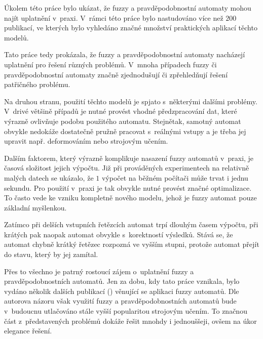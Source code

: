 \documentclass[
  master,
  field=inf,
  biblatex=true,
  language=czech,
  theorems=false,
  sourcecodes=false,
  glossaries=false,
  index=false,
]{kidiplom}
\numberwithin{definition}{section}
\numberwithin{theorem}{section}
\numberwithin{note}{section}
\numberwithin{example}{section}
\begin{document}
\begin{kiconclusions}
Úkolem této práce bylo ukázat, že fuzzy a pravděpodobnostní automaty mohou najít uplatnění v~praxi. V~rámci této práce bylo nastudováno více než $200$ publikací, ve kterých bylo vyhledáno značné množství praktických aplikací těchto modelů.

Tato práce tedy prokázala, že fuzzy a pravděpodobnostní automaty nacházejí uplatnění pro řešení různých problémů. V~mnoha případech fuzzy či pravděpodobnostní automaty značně zjednodušují či zpřehledňují řešení patřičného problému.

Na druhou stranu, použití těchto modelů je spjato s~některými dalšími problémy. V~drivé většině případů je nutné provést vhodné předzpracování dat, které výrazně ovlivňuje podobu použitého automatu. Stejnětak, samotný automat obvykle nedokáže dostatečně pružně pracovat s~reálnými vstupy a je třeba jej upravit např. deformováním nebo strojovým učením.

Dalším faktorem, který výrazně komplikuje nasazení fuzzy automatů v~praxi, je časová složitost jejich výpočtu. Již při prováděných experimentech na relativně malých datech se ukázalo, že $1$ výpočet na běžném počítači může trvat i jednu sekundu. Pro použití v~praxi je tak obvykle nutné provést značné optimalizace. To často vede ke vzniku kompletně nového modelu, jehož je fuzzy automat pouze základní myšlenkou.

Zatímco při delších vstupních řetězcích automat trpí dlouhým časem výpočtu, při krátých pak naopak automat obvykle  s~korektností výsledků. Stává se, že automat chybně krátký řetězec rozpozná ve vyšším stupni, protože automat  přejít do stavu, který by jej zamítal.

Přes to všechno je patrný rostoucí zájem o~uplatnění fuzzy a pravděpodobnostních automatů. Jen za dobu, kdy tato práce vznikala, bylo vydáno několik dalších publikací (\cite{MukRay-StaSplMerProbFiStaAuSigRepAna, ManPra-PriPatDetUsFiStMaFuzTra, Jia+-ExHeaSimMetBasIntHumTheMod, GupRah-CliMonUsFuzSys, CamMerNun-UsFuzAutDiagPrHeaPro}) věnující se aplikaci fuzzy automatů. Dle autorova názoru však využití fuzzy a pravděpodobnostních automatů bude v~budoucnu utlačováno stále vyšší popularitou strojovým učením. To značnou část z~představených problémů dokáže řešit mnohdy i jednouššeji, ovšem na úkor elegance řešení.
\end{kiconclusions}
\end{document}
